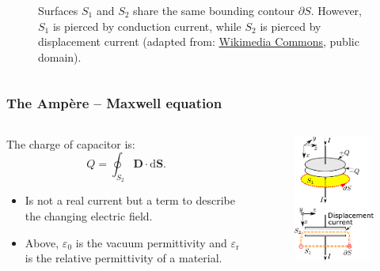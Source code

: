 \begin{frame}
\begin{columns}
\begin{column}{0.45\textwidth}
\begin{figure}
				\caption{Surfaces $S_1$ and $S_2$ share the same bounding contour $\partial S$. However, $S_1$ is pierced by conduction current, while $S_2$ is pierced by displacement current (adapted from: \href{https://commons.wikimedia.org/wiki/File:Displacement_current_in_capacitor.svg}{Wikimedia Commons}, public domain).}
			\end{figure}
		\end{column}
		\end{columns}
\end{frame}

\begin{frame}
	\frametitle{The Amp\`ere -- Maxwell equation}
	\begin{columns}
		\begin{column}{0.6\textwidth}
			The charge of capacitor is:
            $$Q = \oint_{S_2} \bm{D}\cdot \mathrm{d}\bm{S}.$$
            \begin{itemize}
                \item<3-> Is not a real current but a term to describe the changing electric field.
                \item<4-> Above, $\varepsilon_0$ is the vacuum permittivity and $\varepsilon_\mathrm{r}$ is the relative permittivity of a material.
            \end{itemize}
		\end{column}
        \hfill
		\begin{column}{0.4\textwidth}
			\begin{figure}
				\centering
				\includegraphics[height=0.65\textheight]{fig/lec02/Maxwell_integral_displacement_current.pdf}

\end{figure}
\end{column}
\end{columns}
\end{frame}

